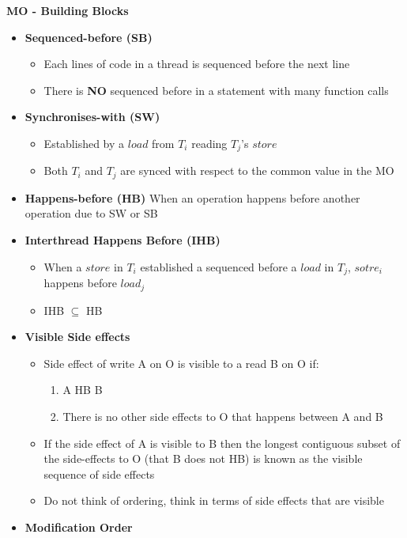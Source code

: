 \documentclass[10pt, landscape]{article}
\begin{document}
\begin{multicols}{4}
\textbf{MO - Building Blocks} \\
\begin{itemize}
    \item \textbf{Sequenced-before (SB)}
    \begin{itemize}
        \item Each lines of code in a thread is sequenced before the next line
        \item There is \textbf{NO} sequenced before in a statement with many function calls 
    \end{itemize}
    \item \textbf{Synchronises-with (SW)}
    \begin{itemize}
        \item Established by a $load$ from $T_i$ reading $T_j$'s $store$ 
        \item Both $T_i$ and $T_j$ are synced with respect to the common value in the MO
    \end{itemize}
    \item \textbf{Happens-before (HB)} When an operation happens before another operation due to SW or SB
    \item \textbf{Interthread Happens Before (IHB)}
    \begin{itemize}
        \item When a $store$ in $T_i$ established a sequenced before a $load$ in $T_j$, $sotre_i$ happens before $load_j$ 
        \item IHB $\subseteq$ HB
    \end{itemize}
    \item \textbf{Visible Side effects} 
    \begin{itemize}
        \item Side effect of write A on O is visible to a read B on O if:
        \begin{enumerate}
            \item A HB B
            \item There is no other side effects to O that happens between A and B
        \end{enumerate}
        \item If the side effect of A is visible to B then the longest contiguous subset of the side-effects to O (that B does not HB) is known as the visible sequence of side effects 
        \item Do not think of ordering, think in terms of side effects that are visible
    \end{itemize}
    \item \textbf{Modification Order}
\end{itemize}


\end{multicols}
\end{document}
